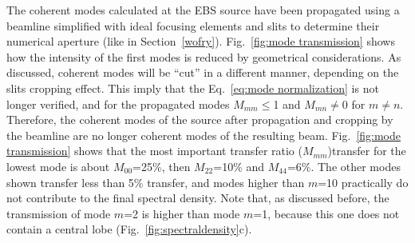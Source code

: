 \documentclass{iucr}              %
\begin{document}
The coherent modes calculated at the EBS source have been propagated using a beamline simplified with ideal focusing elements and slits to determine their numerical aperture (like in Section~\ref{wofry}). Fig.~\ref{fig:mode transmission} shows how the intensity of the first modes is reduced by geometrical considerations. 
As discussed, coherent modes will be ``cut'' in a different manner, depending on the slits cropping effect.
This imply that the Eq.~\ref{eq:mode normalization} is not longer verified, and for the propagated modes $M_{mm}\le$1 and $M_{mn}\ne$0 for $m\ne n$. Therefore, the coherent modes of the source after propagation and cropping by the beamline are no longer coherent modes of the resulting beam. Fig.~\ref{fig:mode transmission} shows that the most important transfer ratio ($M_{mm}$)transfer for the lowest mode is about $M_{00}$=25\%, then $M_{22}$=10\% and $M_{44}$=6\%. The other modes shown transfer less than 5\% transfer, and modes higher than $m$=10 practically do not contribute to the final spectral density. Note that, as discussed before, the transmission of mode $m$=2 is higher than mode $m$=1, because this one does not contain a central lobe (Fig.~\ref{fig:spectraldensity}c).  

\end{document}
